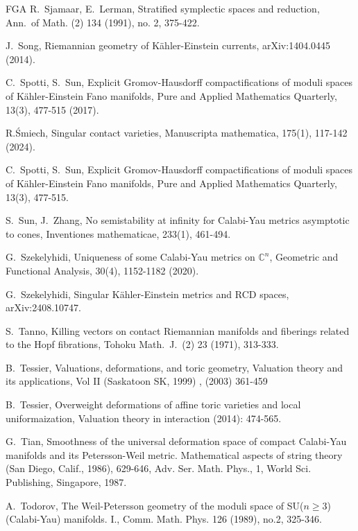 \documentclass[12pt,a4paper]{amsart}
\theoremstyle{remark}
\theoremstyle{definition}
\def\C{\mathbb{C}}
\begin{document}
\begin{thebibliography}{FGA}
R.~Sjamaar, E.~Lerman, 
Stratified symplectic spaces and reduction, 
Ann.\ of Math. (2) 134 (1991), no. 2, 375-422.

J.~Song, Riemannian geometry of K\"ahler-Einstein currents, arXiv:1404.0445 (2014). 

C.~Spotti, S.~Sun, Explicit Gromov-Hausdorff compactifications of moduli spaces of K\"ahler-Einstein Fano manifolds, Pure and Applied Mathematics Quarterly, 13(3), 477-515 (2017). 

R.\'{S}miech, 
Singular contact varieties, Manuscripta mathematica, 175(1), 117-142 
(2024). 

C.~Spotti, S.~Sun, Explicit Gromov-Hausdorff compactifications of moduli spaces of K\"ahler-Einstein Fano manifolds, 
Pure and Applied Mathematics Quarterly, 13(3), 477-515. 

S.~Sun, J.~Zhang, No semistability at infinity for Calabi-Yau metrics asymptotic to cones, 
Inventiones mathematicae, 233(1), 461-494. 

G.~Szekelyhidi, 
Uniqueness of some Calabi-Yau metrics on $\C^n$, 
Geometric and Functional Analysis, 30(4), 1152-1182 (2020). 

G.~Szekelyhidi, Singular K\"ahler-Einstein metrics and RCD spaces, arXiv:2408.10747.

S.~Tanno, 
Killing vectors on contact Riemannian manifolds and fiberings related to 
the Hopf fibrations, Tohoku Math.\ J.\ (2) 23 (1971), 313-333. 

 B.~Tessier,  Valuations, deformations, and toric geometry, Valuation theory and its applications, Vol II (Saskatoon SK, 1999) , (2003) 361-459 

 B.~Tessier, Overweight 
deformations of affine toric varieties and local 
uniformaization, Valuation theory in interaction 
(2014): 474-565. 


G.~Tian, Smoothness of the universal deformation space of compact Calabi-Yau manifolds and its Petersson-Weil metric. 
Mathematical aspects of string theory (San Diego, Calif., 1986), 629-646, Adv. Ser. Math. Phys., 1, World Sci. Publishing, 
Singapore, 1987.

A.~Todorov,
The Weil-Petersson geometry of the moduli space of SU($n\ge 3$) (Calabi-Yau) manifolds. I., 
Comm. Math. Phys. 126 (1989), no.2, 325-346.


\end{thebibliography}
\end{document}
